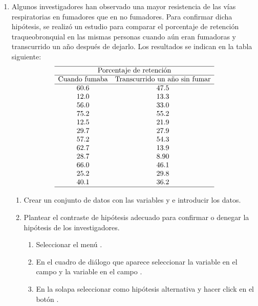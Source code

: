\begin{enumerate}[leftmargin=*]
\item Algunos investigadores han observado una mayor resistencia de las vías respiratorias en fumadores que en no
fumadores.
Para confirmar dicha hipótesis, se realizó un estudio para comparar el porcentaje de retención traqueobronquial en las
mismas personas cuando aún eran fumadoras y transcurrido un año después de dejarlo.
Los resultados se indican en la tabla siguiente:
\[
\begin{array}{cc}
\hline
\multicolumn{2}{c}{\text{Porcentaje de retención}} \\
\hline
\text{Cuando fumaba} & \text{Transcurrido un año sin fumar} \\
\hline
60.6 & 47.5 \\
12.0 & 13.3 \\
56.0 & 33.0 \\
75.2 & 55.2 \\
12.5 & 21.9 \\
29.7 & 27.9 \\
57.2 & 54.3 \\
62.7 & 13.9 \\
28.7 & 8.90 \\
66.0 & 46.1 \\
25.2 & 29.8 \\
40.1 & 36.2 \\
\hline
\end{array}
\]

\begin{enumerate}
\item Crear un conjunto de datos con las variables  y  e introducir los datos.

\item Plantear el contraste de hipótesis adecuado para confirmar o denegar la hipótesis de los investigadores. 
\begin{indicacion}
\begin{enumerate}
\item Seleccionar el menú .
\item En el cuadro de diálogo que aparece seleccionar la variable  en el campo  y la variable
 en el campo .
\item En la solapa  seleccionar como hipótesis alternativa  y hacer
click en el botón .
\end{enumerate}
\end{indicacion}
\end{enumerate}



\end{enumerate}
